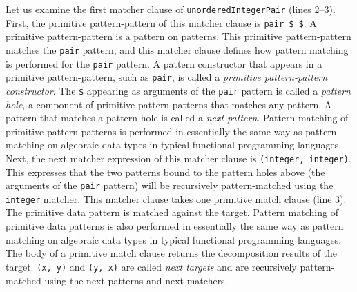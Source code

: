 Let us examine the first matcher clause of \lstinline{unorderedIntegerPair} (lines 2--3).
First, the primitive pattern-pattern of this matcher clause is \lstinline{pair $ $}.
A primitive pattern-pattern is a pattern on patterns.
This primitive pattern-pattern matches the \lstinline{pair} pattern, and this matcher clause defines how pattern matching is performed for the \lstinline{pair} pattern.
A pattern constructor that appears in a primitive pattern-pattern, such as \lstinline{pair}, is called a \emph{primitive pattern-pattern constructor}.
The \lstinline{$} appearing as arguments of the \lstinline{pair} pattern is called a \emph{pattern hole}, a component of primitive pattern-patterns that matches any pattern.
A pattern that matches a pattern hole is called a \emph{next pattern}.
Pattern matching of primitive pattern-patterns is performed in essentially the same way as pattern matching on algebraic data types in typical functional programming languages.
Next, the next matcher expression of this matcher clause is \lstinline{(integer, integer)}.
This expresses that the two patterns bound to the pattern holes above (the arguments of the \lstinline{pair} pattern) will be recursively pattern-matched using the \lstinline{integer} matcher.
This matcher clause takes one primitive match clause (line 3).
The primitive data pattern is matched against the target.
Pattern matching of primitive data patterns is also performed in essentially the same way as pattern matching on algebraic data types in typical functional programming languages.
The body of a primitive match clause returns the decomposition results of the target.
\lstinline{(x, y)} and \lstinline{(y, x)} are called \emph{next targets} and are recursively pattern-matched using the next patterns and next matchers.

